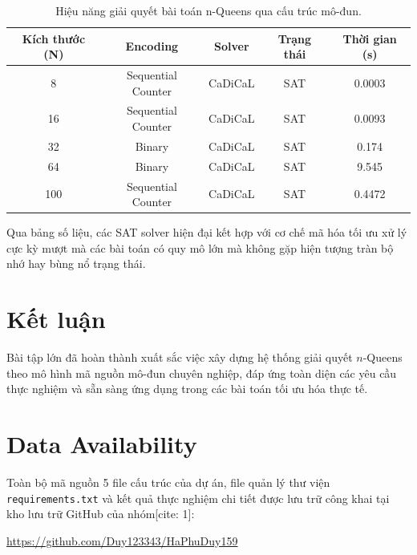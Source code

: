 \documentclass[a4paper,fleqn]{cas-sc}
\begin{document}
\begin{table}[ht]
\centering
\begin{tabular}{ccccc}
\hline
\textbf{Kích thước (N)} & \textbf{Encoding} & \textbf{Solver} & \textbf{Trạng thái} & \textbf{Thời gian (s)} \\
\hline
8 & Sequential Counter & CaDiCaL & SAT & 0.0003 \\
16 & Sequential Counter & CaDiCaL & SAT & 0.0093 \\
32 & Binary & CaDiCaL & SAT & 0.174 \\
64 & Binary & CaDiCaL & SAT & 9.545 \\
100 & Sequential Counter & CaDiCaL & SAT & 0.4472 \\
\hline
\end{tabular}
\caption{Hiệu năng giải quyết bài toán n-Queens qua cấu trúc mô-đun.}
\label{tab:results}
\end{table}

Qua bảng số liệu, các SAT solver hiện đại kết hợp với cơ chế mã hóa tối ưu xử lý cực kỳ mượt mà các bài toán có quy mô lớn mà không gặp hiện tượng tràn bộ nhớ hay bùng nổ trạng thái.

\section{Kết luận}
Bài tập lớn đã hoàn thành xuất sắc việc xây dựng hệ thống giải quyết $n$-Queens theo mô hình mã nguồn mô-đun chuyên nghiệp, đáp ứng toàn diện các yêu cầu thực nghiệm và sẵn sàng ứng dụng trong các bài toán tối ưu hóa thực tế.

\section*{Data Availability}
Toàn bộ mã nguồn 5 file cấu trúc của dự án, file quản lý thư viện \texttt{requirements.txt} và kết quả thực nghiệm chi tiết được lưu trữ công khai tại kho lưu trữ GitHub của nhóm[cite: 1]:
\begin{center}
\url{https://github.com/Duy123343/HaPhuDuy159}
\end{center}



\end{document}
